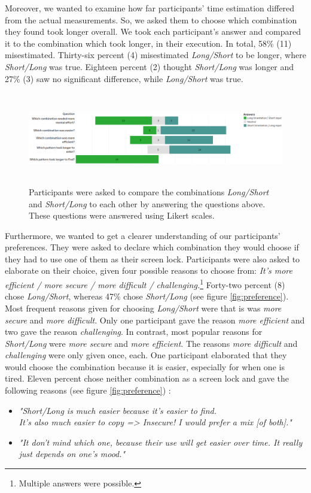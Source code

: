 Moreover, we wanted to examine how far participants' time estimation differed from the actual measurements. So, we asked them to choose which combination they found took longer overall. We took each participant's answer and compared it to the combination which took longer, in their execution. In total, 58\% (11) misestimated. Thirty-six percent (4) misestimated \textit{Long/Short} to be longer, where \textit{Short/Long} was true. Eighteen percent (2) thought \textit{Short/Long} was longer and 27\% (3) saw no significant difference, while \textit{Long/Short} was true. \\

\begin{figure}[t!]
\centering
\includegraphics[width=15cm, height=4cm]{Chapters/graphics/Likert2.png}
\caption{Participants were asked to compare the combinations \textit{Long/Short} and \textit{Short/Long} to each other by answering the questions above. These questions were answered using Likert scales. }
\label{fig:likert2}
\end{figure}

Furthermore, we wanted to get a clearer understanding of our participants' preferences. They were asked to declare which combination they would choose if they had to use one of them as their screen lock. Participants were also asked to elaborate on their choice, given four possible reasons to choose from: \textit{It's more efficient / more secure / more difficult / challenging.}\footnote{Multiple answers were possible.}
Forty-two percent (8) chose \textit{Long/Short}, whereas 47\% chose \textit{Short/Long} (see figure \ref{fig:preference}). Most frequent reasons given for choosing \textit{Long/Short} were that is was \textit{more secure} and \textit{more difficult}. Only one participant gave the reason \textit{more efficient} and two gave the reason \textit{challenging}. In contrast, most popular reasons for \textit{Short/Long} were \textit{more secure} and \textit{more efficient}. The reasons \textit{more difficult} and \textit{challenging} were only given once, each. One participant elaborated that they would choose the combination because it is easier, especially for when one is tired. Eleven percent chose neither combination as a screen lock and gave the following reasons (see figure \ref{fig:preference}) : 
\begin{itemize}
    \item \textit{"Short/Long is much easier because it's easier to find.\\ It's also much easier to copy => Insecure! I would prefer a mix [of both]."}
    \item \textit{"It don't mind which one, because their use will get easier over time. It really just depends on one's mood."} 
\end{itemize}

